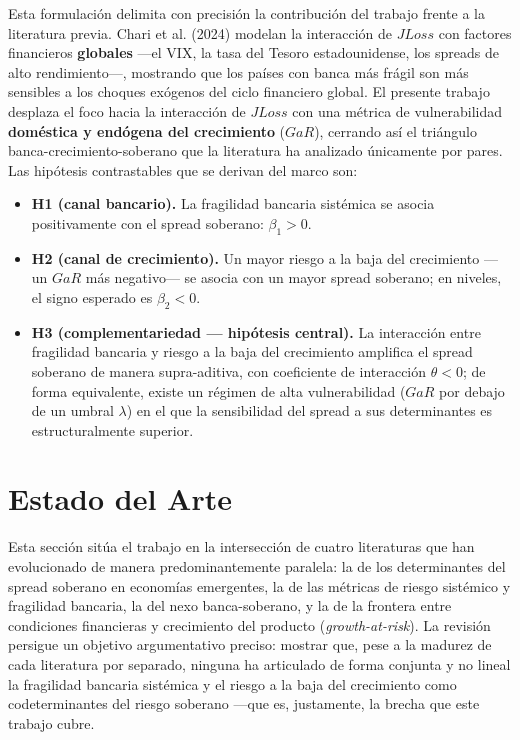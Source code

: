 \documentclass[5p,times,twocolumn,authoryear]{elsarticle}
\begin{document}
Esta formulación delimita con precisión la contribución del trabajo frente a la literatura previa. Chari et al. (2024) modelan la interacción de $JLoss$ con factores financieros \textbf{globales} —el VIX, la tasa del Tesoro estadounidense, los spreads de alto rendimiento—, mostrando que los países con banca más frágil son más sensibles a los choques exógenos del ciclo financiero global. El presente trabajo desplaza el foco hacia la interacción de $JLoss$ con una métrica de vulnerabilidad \textbf{doméstica y endógena del crecimiento} ($GaR$), cerrando así el triángulo banca-crecimiento-soberano que la literatura ha analizado únicamente por pares. Las hipótesis contrastables que se derivan del marco son:

\begin{itemize}
    \item \textbf{H1 (canal bancario).} La fragilidad bancaria sistémica se asocia positivamente con el spread soberano: $\beta_{1} > 0$.
    \item \textbf{H2 (canal de crecimiento).} Un mayor riesgo a la baja del crecimiento —un $GaR$ más negativo— se asocia con un mayor spread soberano; en niveles, el signo esperado es $\beta_{2} < 0$.
    \item \textbf{H3 (complementariedad — hipótesis central).} La interacción entre fragilidad bancaria y riesgo a la baja del crecimiento amplifica el spread soberano de manera supra-aditiva, con coeficiente de interacción $\theta < 0$; de forma equivalente, existe un régimen de alta vulnerabilidad ($GaR$ por debajo de un umbral $\lambda$) en el que la sensibilidad del spread a sus determinantes es estructuralmente superior.
\end{itemize}


\section{Estado del Arte}

Esta sección sitúa el trabajo en la intersección de cuatro literaturas que han evolucionado de manera predominantemente paralela: la de los determinantes del spread soberano en economías emergentes, la de las métricas de riesgo sistémico y fragilidad bancaria, la del nexo banca-soberano, y la de la frontera entre condiciones financieras y crecimiento del producto (\textit{growth-at-risk}). La revisión persigue un objetivo argumentativo preciso: mostrar que, pese a la madurez de cada literatura por separado, ninguna ha articulado de forma conjunta y no lineal la fragilidad bancaria sistémica y el riesgo a la baja del crecimiento como codeterminantes del riesgo soberano —que es, justamente, la brecha que este trabajo cubre.
\end{document}
